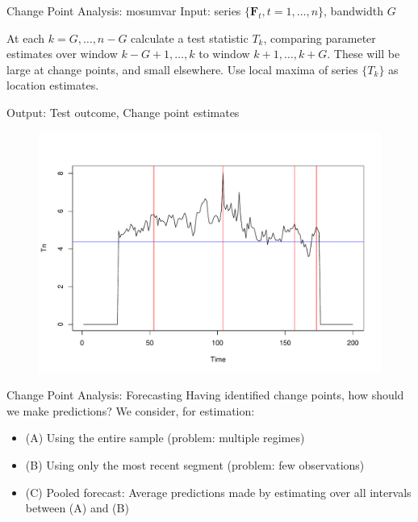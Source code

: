 \documentclass[11pt]{beamer}
\begin{document}
\begin{frame}{Change Point Analysis: mosumvar} 
 Input: series $\{\boldsymbol{F}_t, t = 1, \dots, n \}$, bandwidth $G$
 
 At each $k= G,\dots, n-G$ calculate a test statistic $T_k$, comparing parameter estimates over window $k-G+1, \dots, k$ to window $k+1, \dots, k+G$. These will be large at change points, and small elsewhere. Use local maxima of series $\{T_k\}$ as location estimates.
 
 Output: Test outcome, Change point estimates
 
 
 \begin{figure}[h!]
	\centering
	\includegraphics[scale=0.25]{app/datachangepoints.pdf}
 
\end{figure} 
\end{frame}


\begin{frame}{Change Point Analysis: Forecasting}
Having identified change points, how should we make predictions?
We consider, for estimation:
\begin{itemize}
	\item (A) Using the entire sample (problem: multiple regimes)
	\item (B) Using only the most recent segment (problem: few observations)
	\item (C) Pooled forecast: Average predictions made by estimating over all intervals between (A) and (B)
\end{itemize}



\end{frame} 
\end{document}
